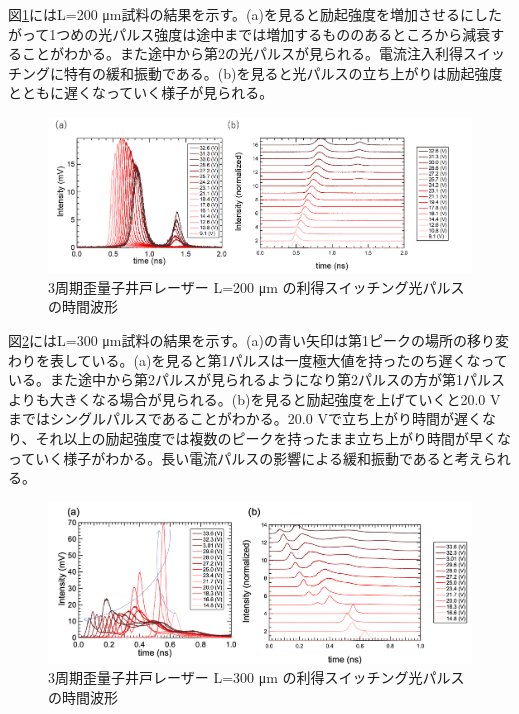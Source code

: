 {図\ref{fig:fig_3_2_3QW_ridge_L200_GS}にはL=200 \si{\micro\metre}試料の結果を示す。(a)を見ると励起強度を増加させるにしたがって1つめの光パルス強度は途中までは増加するもののあるところから減衰することがわかる。また途中から第2の光パルスが見られる。電流注入利得スイッチングに特有の緩和振動である。(b)を見ると光パルスの立ち上がりは励起強度とともに遅くなっていく様子が見られる。


\begin{figure}[h]
	\centering
	\includegraphics[width=15cm]{figure/fig_3_2_3QW_ridge_L200_GS.png}
		\caption{3周期歪量子井戸レーザー L=200 \si{\micro\metre} の利得スイッチング光パルスの時間波形}
		\label{fig:fig_3_2_3QW_ridge_L200_GS}
\end{figure}



図\ref{fig:fig_3_2_3QW_ridge_L300_GS}にはL=300 \si{\micro\metre}試料の結果を示す。(a)の青い矢印は第1ピークの場所の移り変わりを表している。(a)を見ると第1パルスは一度極大値を持ったのち遅くなっている。また途中から第2パルスが見られるようになり第2パルスの方が第1パルスよりも大きくなる場合が見られる。(b)を見ると励起強度を上げていくと20.0 Vまではシングルパルスであることがわかる。20.0 Vで立ち上がり時間が遅くなり、それ以上の励起強度では複数のピークを持ったまま立ち上がり時間が早くなっていく様子がわかる。長い電流パルスの影響による緩和振動であると考えられる。
\begin{figure}[h]
	\centering
	\includegraphics[width=15cm]{figure/fig_3_2_3QW_ridge_L300_GS.png}
		\caption{3周期歪量子井戸レーザー L=300 \si{\micro\metre} の利得スイッチング光パルスの時間波形}
		\label{fig:fig_3_2_3QW_ridge_L300_GS}
\end{figure}


}

